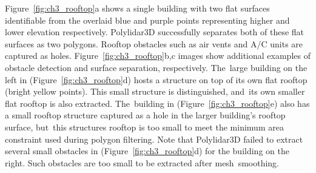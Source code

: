 Figure~\ref{fig:ch3_rooftop}a shows a single building with two flat surfaces identifiable from the overlaid blue and purple points representing higher and lower elevation respectively.  Polylidar3D successfully separates both of these flat surfaces as two polygons. Rooftop obstacles such as air vents and A/C units are captured as holes. Figure~\ref{fig:ch3_rooftop}b,c images show additional examples of obstacle detection and surface separation, respectively. The~large building on the left in (Figure~\ref{fig:ch3_rooftop}d) hosts a structure on top of its own flat rooftop (bright yellow points). This small structure is distinguished, and~its own smaller flat rooftop is also extracted. The~building in (Figure~\ref{fig:ch3_rooftop}e) also has a small rooftop structure captured as a hole in the larger building's rooftop surface, but~this structures rooftop is too small to meet the minimum area constraint used during polygon filtering. Note that Polylidar3D failed to extract several small obstacles in (Figure~\ref{fig:ch3_rooftop}d) for the building on the right. Such obstacles are too small to be extracted after mesh~smoothing. 



